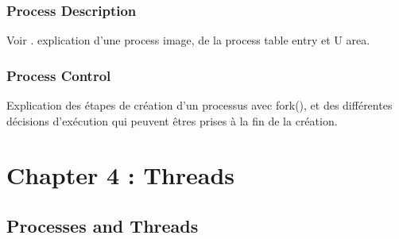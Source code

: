 \subsubsection{Process Description}
Voir \cite[pp.~169-171]{stallings}.
explication d'une process image, de la process table entry et U area.

\subsubsection{Process Control}
Explication des étapes de création d'un processus avec fork(), et des différentes décisions d'exécution qui peuvent êtres prises à la fin de la création.

\newpage


\section{Chapter 4 : Threads}

\subsection{Processes and Threads }
